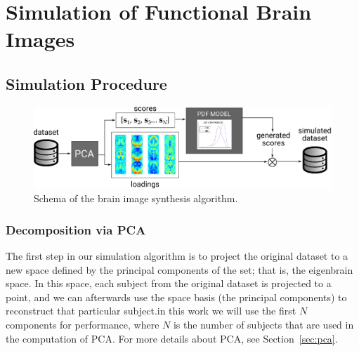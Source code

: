\chapter{Simulation of Functional Brain Images}\label{ch:simulation}
\section{Simulation Procedure}

\begin{figure}[htp]
	\centering
	\includegraphics[width=\textwidth]{Graphics/ch9/SchemaGeneration}
	\caption{Schema of the brain image synthesis algorithm.}
	\label{fig:simulationSchema}
\end{figure}
\subsection{Decomposition via PCA}
The first step in our simulation algorithm is to project the original dataset to a new space defined by the principal components of the set; that is, the eigenbrain space. In this space, each subject from the original dataset is projected to a point, and we can afterwards use the space basis (the principal components) to reconstruct that particular subject.in this work we will use the first $N$ components for performance, where $N$ is the number of subjects that are used in the computation of \ac{PCA}. For more details about \ac{PCA}, see Section~\ref{sec:pca}. 


